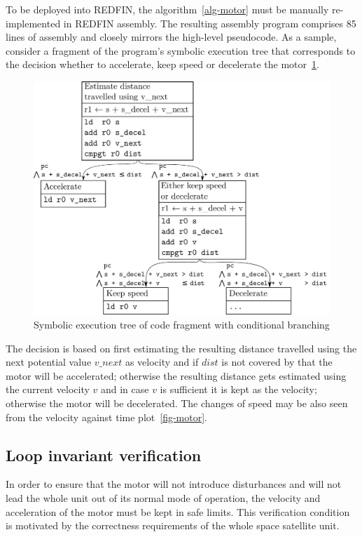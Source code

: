 To be deployed into REDFIN, the algorithm~\ref{alg-motor} must be manually
re-implemented in REDFIN assembly. The resulting assembly program comprises 85 lines of
assembly and closely mirrors the high-level pseudocode. As a sample, consider a fragment of
the program's symbolic execution tree that corresponds to the decision whether to
accelerate, keep speed or decelerate the motor~\ref{fig-sym-tree}.

\begin{figure}[h]
\centerline{\includegraphics[scale=0.4]{fig/sym-tree-1.pdf}}
\caption{Symbolic execution tree of code fragment with conditional branching\label{fig-sym-tree}}
\end{figure}

The decision is based on first estimating the resulting distance travelled using
the next potential value $v\_next$ as velocity and if $dist$ is not covered by that
the motor will be accelerated; otherwise the resulting distance gets estimated
using the current velocity $v$ and in case $v$ is sufficient it is kept as the
velocity; otherwise the motor will be decelerated. The changes of speed may be
also seen from the velocity against time plot~\ref{fig-motor}.


\subsection{Loop invariant verification}

In order to ensure that the motor will not introduce disturbances
and will not lead the whole unit out of its normal mode of operation, the velocity and
acceleration of the motor must be kept in safe limits. This verification condition
is motivated by the correctness requirements of the whole space satellite unit.

